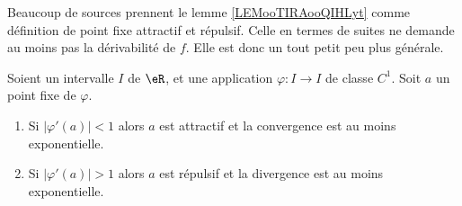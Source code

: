 \begin{normaltext}
	Beaucoup de sources prennent le lemme \ref{LEMooTIRAooQIHLyt} comme définition de point fixe attractif et répulsif. Celle en termes de suites ne demande au moins pas la dérivabilité de \( f\). Elle est donc un tout petit peu plus générale.
\end{normaltext}

\begin{lemma}		\label{LEMooTIRAooQIHLyt}
	Soient un intervalle \( I\) de \( \eR\), et une application \(\varphi \colon I\to I  \) de classe \( C^1\). Soit \( a\) un point fixe de \( \varphi\).
	\begin{enumerate}
		\item
		      Si \( | \varphi'(a) |<1\) alors \( a\) est attractif et la convergence est au moins exponentielle.
		\item
		      Si \( | \varphi'(a) |>1\) alors \( a\) est répulsif et la divergence est au moins exponentielle.
	\end{enumerate}
\end{lemma}

